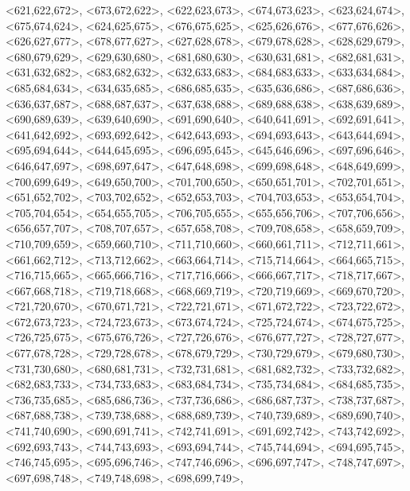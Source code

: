 \documentclass[a4paper,10pt]{article}
\begin{document}
\begin{eulernotebook}
\begin{euleroutput}
  <621,622,672>,
  <673,672,622>,
  <622,623,673>,
  <674,673,623>,
  <623,624,674>,
  <675,674,624>,
  <624,625,675>,
  <676,675,625>,
  <625,626,676>,
  <677,676,626>,
  <626,627,677>,
  <678,677,627>,
  <627,628,678>,
  <679,678,628>,
  <628,629,679>,
  <680,679,629>,
  <629,630,680>,
  <681,680,630>,
  <630,631,681>,
  <682,681,631>,
  <631,632,682>,
  <683,682,632>,
  <632,633,683>,
  <684,683,633>,
  <633,634,684>,
  <685,684,634>,
  <634,635,685>,
  <686,685,635>,
  <635,636,686>,
  <687,686,636>,
  <636,637,687>,
  <688,687,637>,
  <637,638,688>,
  <689,688,638>,
  <638,639,689>,
  <690,689,639>,
  <639,640,690>,
  <691,690,640>,
  <640,641,691>,
  <692,691,641>,
  <641,642,692>,
  <693,692,642>,
  <642,643,693>,
  <694,693,643>,
  <643,644,694>,
  <695,694,644>,
  <644,645,695>,
  <696,695,645>,
  <645,646,696>,
  <697,696,646>,
  <646,647,697>,
  <698,697,647>,
  <647,648,698>,
  <699,698,648>,
  <648,649,699>,
  <700,699,649>,
  <649,650,700>,
  <701,700,650>,
  <650,651,701>,
  <702,701,651>,
  <651,652,702>,
  <703,702,652>,
  <652,653,703>,
  <704,703,653>,
  <653,654,704>,
  <705,704,654>,
  <654,655,705>,
  <706,705,655>,
  <655,656,706>,
  <707,706,656>,
  <656,657,707>,
  <708,707,657>,
  <657,658,708>,
  <709,708,658>,
  <658,659,709>,
  <710,709,659>,
  <659,660,710>,
  <711,710,660>,
  <660,661,711>,
  <712,711,661>,
  <661,662,712>,
  <713,712,662>,
  <663,664,714>,
  <715,714,664>,
  <664,665,715>,
  <716,715,665>,
  <665,666,716>,
  <717,716,666>,
  <666,667,717>,
  <718,717,667>,
  <667,668,718>,
  <719,718,668>,
  <668,669,719>,
  <720,719,669>,
  <669,670,720>,
  <721,720,670>,
  <670,671,721>,
  <722,721,671>,
  <671,672,722>,
  <723,722,672>,
  <672,673,723>,
  <724,723,673>,
  <673,674,724>,
  <725,724,674>,
  <674,675,725>,
  <726,725,675>,
  <675,676,726>,
  <727,726,676>,
  <676,677,727>,
  <728,727,677>,
  <677,678,728>,
  <729,728,678>,
  <678,679,729>,
  <730,729,679>,
  <679,680,730>,
  <731,730,680>,
  <680,681,731>,
  <732,731,681>,
  <681,682,732>,
  <733,732,682>,
  <682,683,733>,
  <734,733,683>,
  <683,684,734>,
  <735,734,684>,
  <684,685,735>,
  <736,735,685>,
  <685,686,736>,
  <737,736,686>,
  <686,687,737>,
  <738,737,687>,
  <687,688,738>,
  <739,738,688>,
  <688,689,739>,
  <740,739,689>,
  <689,690,740>,
  <741,740,690>,
  <690,691,741>,
  <742,741,691>,
  <691,692,742>,
  <743,742,692>,
  <692,693,743>,
  <744,743,693>,
  <693,694,744>,
  <745,744,694>,
  <694,695,745>,
  <746,745,695>,
  <695,696,746>,
  <747,746,696>,
  <696,697,747>,
  <748,747,697>,
  <697,698,748>,
  <749,748,698>,
  <698,699,749>,

\end{euleroutput}
\end{eulernotebook}
\end{document}
